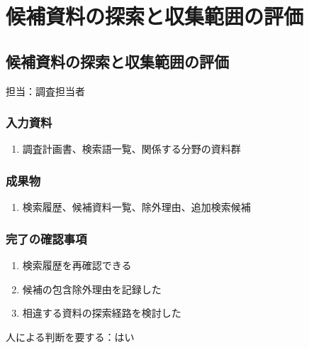 \documentclass[a4paper,11pt]{article}
\begin{document}
\section{候補資料の探索と収集範囲の評価}
\subsection{候補資料の探索と収集範囲の評価}
\par 担当：調査担当者\par\medskip
\subsubsection*{入力資料}
\begin{enumerate}[leftmargin=2em,itemsep=0.35em]
\item 調査計画書、検索語一覧、関係する分野の資料群
\end{enumerate}
\subsubsection*{成果物}
\begin{enumerate}[leftmargin=2em,itemsep=0.35em]
\item 検索履歴、候補資料一覧、除外理由、追加検索候補
\end{enumerate}
\subsubsection*{完了の確認事項}
\begin{enumerate}[leftmargin=2em,itemsep=0.35em]
\item 検索履歴を再確認できる
\item 候補の包含除外理由を記録した
\item 相違する資料の探索経路を検討した
\end{enumerate}
\par 人による判断を要する：はい\par\medskip
\end{document}
